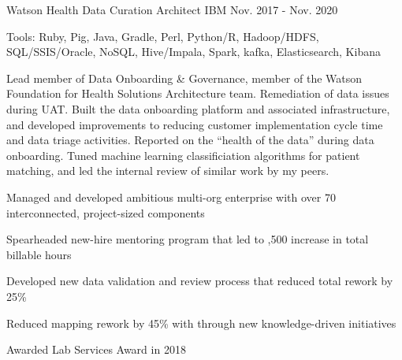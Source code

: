 \begin{cventries}
  \cvexpentry
    {Watson Health} %
    {Data Curation Architect} %
    {IBM}
    {Nov. 2017 - Nov. 2020}
    {
      \begin{cvheavyparagraph}
        Tools: Ruby, Pig, Java, Gradle, Perl, Python/R, Hadoop/HDFS, SQL/SSIS/Oracle, NoSQL, Hive/Impala, Spark, kafka, Elasticsearch, Kibana
      \end{cvheavyparagraph}
    }
    {
      \begin{cvparagraph}
        Lead member of Data Onboarding \& Governance, member of the Watson Foundation for Health Solutions Architecture team.  Remediation of data issues during UAT.  Built the data onboarding platform and associated infrastructure, and developed improvements to reducing customer implementation cycle time and data triage activities.  Reported on the “health of the data” during data onboarding.  Tuned machine learning classificiation algorithms for patient matching, and led the internal review of similar work by my peers.
      \end{cvparagraph}
      \begin{cvitems} %
        \item {Managed and developed ambitious multi-org enterprise with over 70 interconnected, project-sized components}
        \item {Spearheaded new-hire mentoring program that led to ,500 increase in total billable hours}
        \item {Developed new data validation and review process that reduced total rework by 25\%}
        \item {Reduced mapping rework by 45\% with through new knowledge-driven initiatives}
        \item {Awarded Lab Services Award in 2018}
      \end{cvitems}
    }


\end{cventries}

